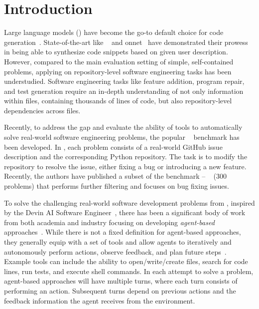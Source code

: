 \section{Introduction}


Large language model{s} () have become the go-to default choice for code generation~\citep{codex,austin2021program,starcoder,magicoder}. 
State-of-the-art  like \gptfour~\citep{gptfour} and \claudesonnet{}onnet~\cite{claudethreefive} have demonstrated their prowess in being able to synthesize code snippets based on given user description. 
However, compared to the main evaluation setting of simple, self-contained problems, applying  on repository-level software engineering tasks has been understudied. 
Software engineering tasks like feature addition, program repair, and test generation require an in-depth understanding of not only information within files, containing thousands of lines of code, but also repository-level dependencies across files. 

Recently, to address the gap and evaluate the ability of tools to automatically solve real-world software engineering problems, the popular \swebench~\cite{swebench} benchmark has been developed. 
In \swebench, each problem consists of a real-world GitHub issue description and the corresponding Python repository.
The task is to modify the repository to resolve the issue, either fixing a bug or introducing a new feature.
Recently, the authors have published a subset of the benchmark -- \swebenchlite~\cite{swebenchlite} (300 problems) that performs further filtering and focuses on bug fixing issues. 

To solve the challenging real-world software development problems from \swebench, {inspired by the Devin AI Software Engineer~\cite{devinwebpage}, there has been a significant body of work from both academia and industry focusing on developing \emph{agent-based} approaches~\cite{autocoderover, aidar, sweagent, coder, repounderstander, bouzenia2024repairagent}}. 
While there is not a fixed definition for agent-based approaches, they generally equip  with a set of tools and allow agents to iteratively and autonomously perform actions, observe feedback, and plan future steps~\cite{liu2024largesurvey}. 
Example tools can include the ability to open/write/create files, search for code lines, run tests, and execute shell commands.  
In each attempt to solve a problem, agent-based approaches will have multiple turns, where each turn consists of performing an action.
Subsequent turns {depend} on previous actions and the feedback information the agent receives from the environment. 



